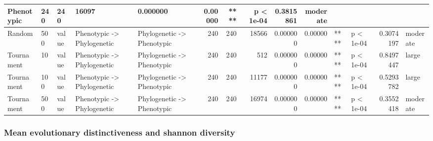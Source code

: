 \documentclass[]{book}
\begin{document}
\begin{table}
\begin{tabular}[t]{l|l|l|l|l|r|r|r|r|r|l|l|r|l}
Phenotypic & 240 & 240 & 16097 & 0.000000 & 0.00000 & **** & p < 1e-04 & 0.3815861 & moderate\\
\hline
Random & 500 & value & Phenotypic
    ->
Phylogenetic & Phylogenetic
    ->
Phenotypic & 240 & 240 & 18566 & 0.000000 & 0.00000 & **** & p < 1e-04 & 0.3074197 & moderate\\
\hline
Tournament & 10 & value & Phenotypic
    ->
Phylogenetic & Phylogenetic
    ->
Phenotypic & 240 & 240 & 512 & 0.000000 & 0.00000 & **** & p < 1e-04 & 0.8497447 & large\\
\hline
Tournament & 100 & value & Phenotypic
    ->
Phylogenetic & Phylogenetic
    ->
Phenotypic & 240 & 240 & 11177 & 0.000000 & 0.00000 & **** & p < 1e-04 & 0.5293782 & large\\
\hline
Tournament & 500 & value & Phenotypic
    ->
Phylogenetic & Phylogenetic
    ->
Phenotypic & 240 & 240 & 16974 & 0.000000 & 0.00000 & **** & p < 1e-04 & 0.3552418 & moderate\\
\hline
\end{tabular}
\end{table}

\hypertarget{mean-evolutionary-distinctiveness-and-shannon-diversity-1}{%
\subsubsection{Mean evolutionary distinctiveness and shannon diversity}\label{mean-evolutionary-distinctiveness-and-shannon-diversity-1}}
\end{document}
